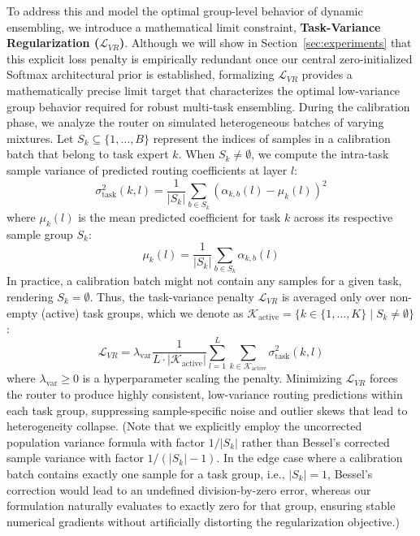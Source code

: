 To address this and model the optimal group-level behavior of dynamic ensembling, we introduce a mathematical limit constraint, \textbf{Task-Variance Regularization ($\mathcal{L}_{VR}$)}. Although we will show in Section~\ref{sec:experiments} that this explicit loss penalty is empirically redundant once our central zero-initialized Softmax architectural prior is established, formalizing $\mathcal{L}_{VR}$ provides a mathematically precise limit target that characterizes the optimal low-variance group behavior required for robust multi-task ensembling. During the calibration phase, we analyze the router on simulated heterogeneous batches of varying mixtures. Let $S_k \subseteq \{1, \dots, B\}$ represent the indices of samples in a calibration batch that belong to task expert $k$. When $S_k \neq \emptyset$, we compute the intra-task sample variance of predicted routing coefficients at layer $l$:
\begin{equation}
    \sigma^2_{\text{task}}(k, l) = \frac{1}{|S_k|} \sum_{b \in S_k} \left( \alpha_{k, b}(l) - \mu_k(l) \right)^2
\end{equation}
where $\mu_k(l)$ is the mean predicted coefficient for task $k$ across its respective sample group $S_k$:
\begin{equation}
    \mu_k(l) = \frac{1}{|S_k|} \sum_{b \in S_k} \alpha_{k, b}(l)
\end{equation}
In practice, a calibration batch might not contain any samples for a given task, rendering $S_k = \emptyset$. Thus, the task-variance penalty $\mathcal{L}_{VR}$ is averaged only over non-empty (active) task groups, which we denote as $\mathcal{K}_{\text{active}} = \{k \in \{1,\dots,K\} \mid S_k \neq \emptyset\}$:
\begin{equation}
    \mathcal{L}_{VR} = \lambda_{\text{var}} \frac{1}{L \cdot |\mathcal{K}_{\text{active}}|} \sum_{l=1}^L \sum_{k \in \mathcal{K}_{\text{active}}} \sigma^2_{\text{task}}(k, l)
\end{equation}
where $\lambda_{\text{var}} \ge 0$ is a hyperparameter scaling the penalty. Minimizing $\mathcal{L}_{VR}$ forces the router to produce highly consistent, low-variance routing predictions within each task group, suppressing sample-specific noise and outlier skews that lead to heterogeneity collapse. (Note that we explicitly employ the uncorrected population variance formula with factor $1/|S_k|$ rather than Bessel's corrected sample variance with factor $1/(|S_k|-1)$. In the edge case where a calibration batch contains exactly one sample for a task group, i.e., $|S_k| = 1$, Bessel's correction would lead to an undefined division-by-zero error, whereas our formulation naturally evaluates to exactly zero for that group, ensuring stable numerical gradients without artificially distorting the regularization objective.)

